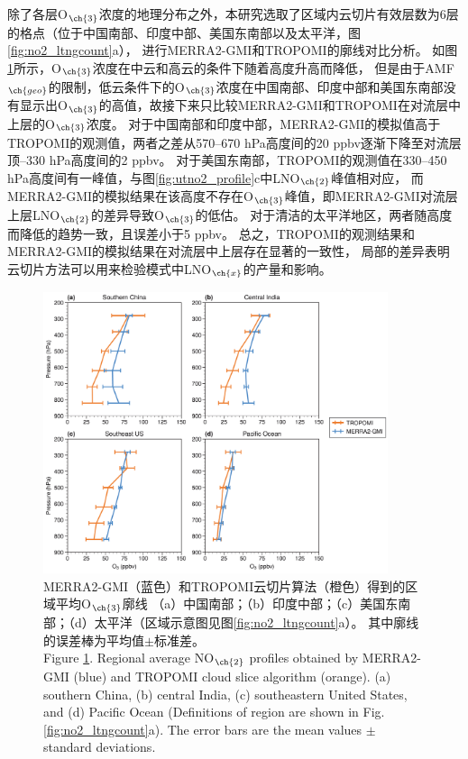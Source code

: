 除了各层O$_{\ch{3}}$浓度的地理分布之外，本研究选取了区域内云切片有效层数为6层的格点（位于中国南部、印度中部、美国东南部以及太平洋，图\ref{fig:no2_ltngcount}a），
进行MERRA2-GMI和TROPOMI的廓线对比分析。
如图\ref{fig:uto3_profile}所示，O$_{\ch{3}}$浓度在中云和高云的条件下随着高度升高而降低，
但是由于AMF$_{\ch{geo}}$的限制，低云条件下的O$_{\ch{3}}$浓度在中国南部、印度中部和美国东南部没有显示出O$_{\ch{3}}$的高值，故接下来只比较MERRA2-GMI和TROPOMI在对流层中上层的O$_{\ch{3}}$浓度。
对于中国南部和印度中部，MERRA2-GMI的模拟值高于TROPOMI的观测值，两者之差从570--670 hPa高度间的20 ppbv逐渐下降至对流层顶--330 hPa高度间的2 ppbv。
对于美国东南部，TROPOMI的观测值在330--450 hPa高度间有一峰值，与图\ref{fig:utno2_profile}c中LNO$_{\ch{2}}$峰值相对应，
而MERRA2-GMI的模拟结果在该高度不存在O$_{\ch{3}}$峰值，即MERRA2-GMI对流层上层LNO$_{\ch{2}}$的差异导致O$_{\ch{3}}$的低估。
对于清洁的太平洋地区，两者随高度而降低的趋势一致，且误差小于5 ppbv。
总之，TROPOMI的观测结果和MERRA2-GMI的模拟结果在对流层中上层存在显著的一致性，
局部的差异表明云切片方法可以用来检验模式中LNO$_{\ch{x}}$的产量和影响。


\begin{figure}[H]
    \centering
    \includegraphics[width=0.9\textwidth]{./figures/uto3_profile.png}
    \caption{
    MERRA2-GMI（蓝色）和TROPOMI云切片算法（橙色）得到的区域平均O$_{\ch{3}}$廓线
    （a）中国南部；（b）印度中部；（c）美国东南部；（d）太平洋（区域示意图见图\ref{fig:no2_ltngcount}a）。
    其中廓线的误差棒为平均值$\pm$标准差。\\
    Figure \ref{fig:uto3_profile}. Regional average NO$_{\ch{2}}$ profiles obtained by MERRA2-GMI (blue) and TROPOMI cloud slice algorithm (orange).
    (a) southern China, (b) central India, (c) southeastern United States, and (d) Pacific Ocean
    (Definitions of region are shown in Fig. \ref{fig:no2_ltngcount}a).
    The error bars are the mean values $\pm$ standard deviations.
    }
    \label{fig:uto3_profile}
\end{figure}

